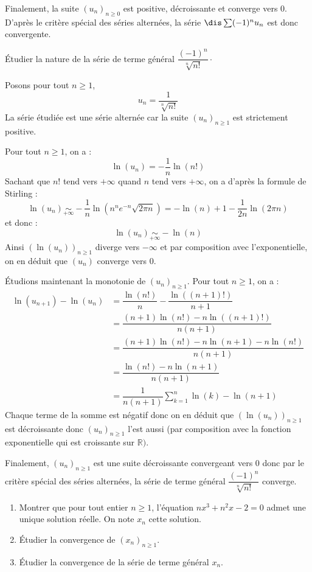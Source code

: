 \documentclass[a4paper,10pt]{report}
\begin{document}
\medskip

\noindent Finalement, la suite $(u_n)_{n \geq 0}$ est positive, décroissante et converge vers $0$. D'après le critère spécial des séries alternées, la série $\dis \sum (-1)^n u_n$ est donc convergente. 

\begin{Exa} Étudier la nature de la série de terme général $\dfrac{(-1)^n}{\sqrt[n]{n!}} \cdot$
\end{Exa}

\corr Posons pour tout $n \geq 1$,
$$ u_n = \dfrac{1}{\sqrt[n]{n!}}$$
La série étudiée est une série alternée car la suite $(u_n)_{n \geq 1}$ est strictement positive. 

 Pour tout $n \geq 1$, on a :
$$ \ln(u_n) = - \dfrac{1}{n} \ln(n!)$$
Sachant que $n!$ tend vers $+ \infty$ quand $n$ tend vers $+ \infty$, on a d'après la formule de Stirling :
$$ \ln(u_n) \underset{+ \infty}{\sim} - \dfrac{1}{n} \ln(n^n e^{-n} \sqrt{2 \pi n}) = - \ln(n) +1 - \dfrac{1}{2n} \ln(2 \pi n)$$
et donc :
$$ \ln(u_n) \underset{+ \infty}{\sim} - \ln(n)$$
Ainsi $(\ln(u_n))_{n \geq 1}$ diverge vers $- \infty$ et par composition avec l'exponentielle, on en déduit que $(u_n)$ converge vers $0$.

\medskip

\noindent Étudions maintenant la monotonie de $(u_n)_{n \geq 1}$. Pour tout $n \geq 1$, on a :
\begin{align*}
\ln(u_{n+1})-\ln(u_n) & = \dfrac{\ln(n!)}{n} - \dfrac{\ln((n+1)!)}{n+1} \\
& = \dfrac{(n+1) \ln(n!)-n \ln((n+1)!)}{n(n+1)} \\
& = \dfrac{(n+1)\ln(n!)-n \ln(n+1)-n \ln(n!)}{n(n+1)} \\
& = \dfrac{\ln(n!)-n \ln(n+1)}{n(n+1)} \\
& = \dfrac{1}{n(n+1)} \sum_{k=1}^n \ln(k) - \ln(n+1) 
\end{align*}
Chaque terme de la somme est négatif donc on en déduit que $(\ln(u_n))_{n \geq 1}$ est décroissante donc $(u_n)_{n \geq 1}$ l'est aussi (par composition avec la fonction exponentielle qui est croissante sur $\mathbb{R})$.

\medskip

\noindent Finalement, $(u_n)_{n \geq 1}$ est une suite décroissante convergeant vers $0$ donc par le critère spécial des séries alternées, la série de terme général $\dfrac{(-1)^n}{\sqrt[n]{n!}}$ converge.

\begin{Exa} 
\begin{enumerate}
\item Montrer que pour tout entier $n \geq 1$, l'équation $nx^3+n^2x-2=0$ admet une unique solution réelle. On note $x_n$ cette solution.
\item Étudier la convergence de $(x_n)_{n \geq 1}$.
\item Étudier la convergence de la série de terme général $x_n$.
\end{enumerate}
\end{Exa}
\end{document}
